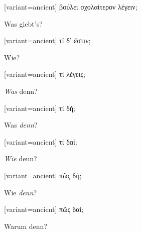 \switchcolumn

\begin{greek}[variant=ancient]%
βούλει σχολαίτερον λέγειν;

\end{greek}%
\indent Was giebt's?

\switchcolumn

\begin{greek}[variant=ancient]%
τί δ' ἔστιν;

\end{greek}%
\switchcolumn*

Wie?

\switchcolumn

\begin{greek}[variant=ancient]%
τί λέγεις;

\end{greek}%
\switchcolumn*

\emph{Was} denn?

\switchcolumn

\begin{greek}[variant=ancient]%
τί δή;

\end{greek}%
\switchcolumn*

Was \emph{denn}?

\switchcolumn

\begin{greek}[variant=ancient]%
τί δαί;

\end{greek}%
\switchcolumn*

\emph{Wie} denn?

\switchcolumn

\begin{greek}[variant=ancient]%
πῶς δή;

\end{greek}%
\switchcolumn*

Wie \emph{denn}?

\switchcolumn

\begin{greek}[variant=ancient]%
πῶς δαί;

\end{greek}%
\switchcolumn*

Warum denn?

